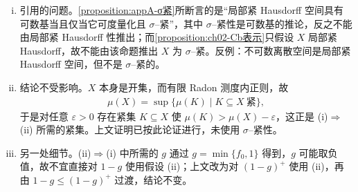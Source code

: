 \documentclass[../../main.tex]{subfiles}%
\begin{document}
\begin{remark}\label{remark:ch02-Cb表示修正}
\begin{enumerate}[(i)]
\item 引用的问题。\cref{proposition:appA-σ紧}所断言的是“局部紧 Hausdorff 空间具有可数基当且仅当它可度量化且 $\sigma$--紧”，其中 $\sigma$--紧性是可数基的推论，反之不能由局部紧 Hausdorff 性推出；而\cref{proposition:ch02-Cb表示}只假设 $X$ 局部紧 Hausdorff，故不能由该命题推出 $X$ 为 $\sigma$--紧。反例：不可数离散空间是局部紧 Hausdorff 空间，但不是 $\sigma$--紧的。
\item 结论不受影响。$X$ 本身是开集，而有限 Radon 测度内正则，故
\begin{align*}
\mu(X)=\sup\{\mu(K)\mid K\subseteq X\ \text{紧}\},
\end{align*}
于是对任意 $\varepsilon>0$ 存在紧集 $K\subseteq X$ 使 $\mu(K)>\mu(X)-\varepsilon$，这正是 (i)$\Rightarrow$(ii) 所需的紧集。上文证明已按此论证进行，未使用 $\sigma$--紧性。
\item 另一处细节。(ii)$\Rightarrow$(i) 中所需的 $g$ 通过 $g=\min\{f_0,1\}$ 得到，$g$ 可能取负值，故不宜直接对 $1-g$ 使用假设 (ii)；上文改为对 $(1-g)^+$ 使用 (ii)，再由 $1-g\leqslant(1-g)^+$ 过渡，结论不变。
\end{enumerate}
\end{remark}
\end{document}
